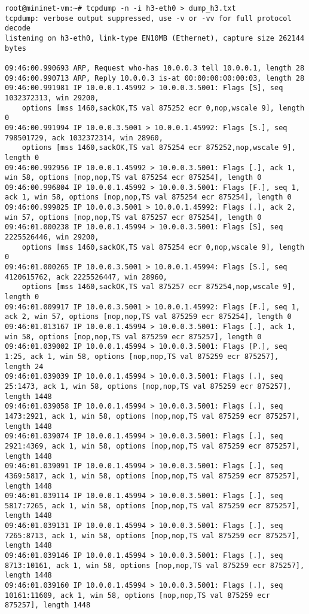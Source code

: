 \documentclass[12pt,letterpaper]{article}
\begin{document}
\begin{tiny}
\begin{verbatim}
root@mininet-vm:~# tcpdump -n -i h3-eth0 > dump_h3.txt
tcpdump: verbose output suppressed, use -v or -vv for full protocol decode
listening on h3-eth0, link-type EN10MB (Ethernet), capture size 262144 bytes

09:46:00.990693 ARP, Request who-has 10.0.0.3 tell 10.0.0.1, length 28
09:46:00.990713 ARP, Reply 10.0.0.3 is-at 00:00:00:00:00:03, length 28
09:46:00.991981 IP 10.0.0.1.45992 > 10.0.0.3.5001: Flags [S], seq 1032372313, win 29200,
    options [mss 1460,sackOK,TS val 875252 ecr 0,nop,wscale 9], length 0
09:46:00.991994 IP 10.0.0.3.5001 > 10.0.0.1.45992: Flags [S.], seq 798501729, ack 1032372314, win 28960,
    options [mss 1460,sackOK,TS val 875254 ecr 875252,nop,wscale 9], length 0
09:46:00.992956 IP 10.0.0.1.45992 > 10.0.0.3.5001: Flags [.], ack 1, win 58, options [nop,nop,TS val 875254 ecr 875254], length 0
09:46:00.996804 IP 10.0.0.1.45992 > 10.0.0.3.5001: Flags [F.], seq 1, ack 1, win 58, options [nop,nop,TS val 875254 ecr 875254], length 0
09:46:00.999825 IP 10.0.0.3.5001 > 10.0.0.1.45992: Flags [.], ack 2, win 57, options [nop,nop,TS val 875257 ecr 875254], length 0
09:46:01.000238 IP 10.0.0.1.45994 > 10.0.0.3.5001: Flags [S], seq 2225526446, win 29200,
    options [mss 1460,sackOK,TS val 875254 ecr 0,nop,wscale 9], length 0
09:46:01.000265 IP 10.0.0.3.5001 > 10.0.0.1.45994: Flags [S.], seq 4120615762, ack 2225526447, win 28960,
    options [mss 1460,sackOK,TS val 875257 ecr 875254,nop,wscale 9], length 0
09:46:01.009917 IP 10.0.0.3.5001 > 10.0.0.1.45992: Flags [F.], seq 1, ack 2, win 57, options [nop,nop,TS val 875259 ecr 875254], length 0
09:46:01.013167 IP 10.0.0.1.45994 > 10.0.0.3.5001: Flags [.], ack 1, win 58, options [nop,nop,TS val 875259 ecr 875257], length 0
09:46:01.039002 IP 10.0.0.1.45994 > 10.0.0.3.5001: Flags [P.], seq 1:25, ack 1, win 58, options [nop,nop,TS val 875259 ecr 875257], length 24
09:46:01.039039 IP 10.0.0.1.45994 > 10.0.0.3.5001: Flags [.], seq 25:1473, ack 1, win 58, options [nop,nop,TS val 875259 ecr 875257], length 1448
09:46:01.039058 IP 10.0.0.1.45994 > 10.0.0.3.5001: Flags [.], seq 1473:2921, ack 1, win 58, options [nop,nop,TS val 875259 ecr 875257], length 1448
09:46:01.039074 IP 10.0.0.1.45994 > 10.0.0.3.5001: Flags [.], seq 2921:4369, ack 1, win 58, options [nop,nop,TS val 875259 ecr 875257], length 1448
09:46:01.039091 IP 10.0.0.1.45994 > 10.0.0.3.5001: Flags [.], seq 4369:5817, ack 1, win 58, options [nop,nop,TS val 875259 ecr 875257], length 1448
09:46:01.039114 IP 10.0.0.1.45994 > 10.0.0.3.5001: Flags [.], seq 5817:7265, ack 1, win 58, options [nop,nop,TS val 875259 ecr 875257], length 1448
09:46:01.039131 IP 10.0.0.1.45994 > 10.0.0.3.5001: Flags [.], seq 7265:8713, ack 1, win 58, options [nop,nop,TS val 875259 ecr 875257], length 1448
09:46:01.039146 IP 10.0.0.1.45994 > 10.0.0.3.5001: Flags [.], seq 8713:10161, ack 1, win 58, options [nop,nop,TS val 875259 ecr 875257], length 1448
09:46:01.039160 IP 10.0.0.1.45994 > 10.0.0.3.5001: Flags [.], seq 10161:11609, ack 1, win 58, options [nop,nop,TS val 875259 ecr 875257], length 1448
\end{verbatim}
\end{tiny}
\end{document}
